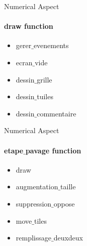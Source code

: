 \documentclass [xcolor=svgnames, t] {beamer}
\begin{document}
\begin{frame}{Numerical Aspect}
 \framesubtitle{draw function}

\begin{itemize}
    \item  gerer$\_$evenements 
    \item ecran$\_$vide 
    \item dessin$\_$grille 
    \item dessin$\_$tuiles 
    \item dessin$\_$commentaire 
\end{itemize} 


\end{frame}




\begin{frame}{Numerical Aspect}
 \framesubtitle{etape$\_$pavage function}

\begin{itemize}
    \item draw 
    \item  augmentation$\_$taille 
    \item suppression$\_$oppose 
    \item move$\_$tiles 
    \item remplissage$\_$deuxdeux 
\end{itemize} 


\end{frame}
\end{document}

